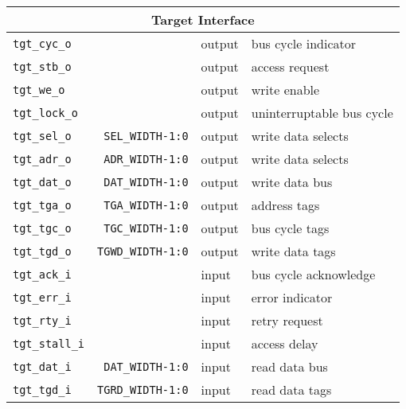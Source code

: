 \begin{center}
\begin{longtable}{|l|r|l|l|}
    \multicolumn{4}{|c|}{\scriptsize{\rule{0pt}{2.5ex} Target Interface}} \global\rownum=1\relax \\  
    \hline                                                                                      
    \texttt{tgt\_cyc\_o}         &                          & output & bus cycle indicator       \\
    \texttt{tgt\_stb\_o}         &                          & output & access request            \\
    \texttt{tgt\_we\_o}          &                          & output & write enable              \\
    \texttt{tgt\_lock\_o}        &                          & output & uninterruptable bus cycle \\
    \texttt{tgt\_sel\_o}         & \texttt{SEL\_WIDTH-1:0}  & output & write data selects        \\
    \texttt{tgt\_adr\_o}         & \texttt{ADR\_WIDTH-1:0}  & output & write data selects        \\
    \texttt{tgt\_dat\_o}         & \texttt{DAT\_WIDTH-1:0}  & output & write data bus            \\
    \texttt{tgt\_tga\_o}         & \texttt{TGA\_WIDTH-1:0}  & output & address tags              \\
    \texttt{tgt\_tgc\_o}         & \texttt{TGC\_WIDTH-1:0}  & output & bus cycle tags            \\
    \texttt{tgt\_tgd\_o}         & \texttt{TGWD\_WIDTH-1:0} & output & write data tags           \\
    \texttt{tgt\_ack\_i}         &                          & input  & bus cycle acknowledge     \\
    \texttt{tgt\_err\_i}         &                          & input  & error indicator           \\
    \texttt{tgt\_rty\_i}         &                          & input  & retry request             \\
    \texttt{tgt\_stall\_i}       &                          & input  & access delay              \\
    \texttt{tgt\_dat\_i}         & \texttt{DAT\_WIDTH-1:0}  & input  & read data bus             \\
    \texttt{tgt\_tgd\_i}         & \texttt{TGRD\_WIDTH-1:0} & input  & read data tags            \\   
  \end{longtable}
\end{center}  
\endgroup

